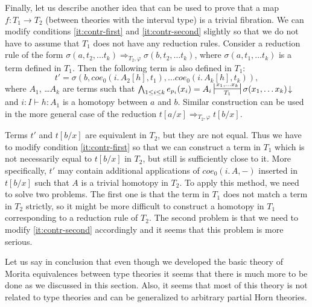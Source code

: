 \documentclass[reqno]{amsart}
\theoremstyle{definition}
\theoremstyle{remark}
\newcommand{\coe}{\mathit{coe}}
\numberwithin{figure}{section}
\begin{document}
Finally, let us describe another idea that can be used to prove that a map $f : T_1 \to T_2$ (between theories with the interval type) is a trivial fibration.
We can modify conditions \eqref{it:contr-first} and \eqref{it:contr-second} slightly so that we do not have to assume that $T_1$ does not have any reduction rules.
Consider a reduction rule of the form $\sigma(a, t_2, \ldots t_k) \Rightarrow_{T_2,\varphi} \sigma(b, t_2, \ldots t_k)$, where $\sigma(a, t_1, \ldots t_k)$ is a term defined in $T_1$.
Then the following term is also defined in $T_1$:
\[ t' = \sigma(b, \coe_0(i.\,A_2[h],t_1), \ldots \coe_0(i.\,A_k[h],t_k)), \]
where $A_1$, \ldots $A_k$ are terms such that $\bigwedge_{1 \leq i \leq k} e_{p_i}(x_i) = A_i \ssststile{T_1}{x_1, \ldots x_k} \sigma(x_1, \ldots x_k)\!\downarrow$ and $i : I \vdash h : A_1$ is a homotopy between $a$ and $b$.
Similar construction can be used in the more general case of the reduction $t[a/x] \Rightarrow_{T_2,\varphi} t[b/x]$.

Terms $t'$ and $t[b/x]$ are equivalent in $T_2$, but they are not equal.
Thus we have to modify condition \eqref{it:contr-first} so that we can construct a term in $T_1$ which is not necessarily equal to $t[b/x]$ in $T_2$, but still is sufficiently close to it.
More specifically, $t'$ may contain additional applications of $\coe_0(i.\,A,-)$ inserted in $t[b/x]$ such that $A$ is a trivial homotopy in $T_2$.
To apply this method, we need to solve two problems.
The first one is that the term in $T_1$ does not match a term in $T_2$ strictly, so it might be more difficult to construct a homotopy in $T_1$ corresponding to a reduction rule of $T_2$.
The second problem is that we need to modify \eqref{it:contr-second} accordingly and it seems that this problem is more serious.

Let us say in conclusion that even though we developed the basic theory of Morita equivalences between type theories it seems that there is much more to be done as we discussed in this section.
Also, it seems that most of this theory is not related to type theories and can be generalized to arbitrary partial Horn theories.



\end{document}
